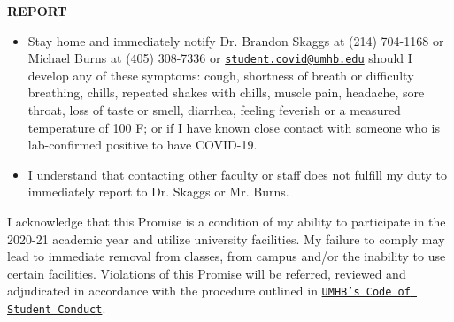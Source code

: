 \documentclass[
]{article}
\begin{document}
\textbf{REPORT}

\begin{itemize}
\item Stay home and immediately notify Dr. Brandon Skaggs at (214) 704-1168 or Michael Burns at (405) 308-7336 or \texttt{\href{mailto:student.covid@umhb.edu}{student.covid@umhb.edu}} should I develop any of these symptoms: cough, shortness of breath or difficulty breathing, chills, repeated shakes with chills, muscle pain, headache, sore throat, loss of taste or smell, diarrhea, feeling feverish or a measured temperature of 100 F; or if I have known close contact with someone who is lab-confirmed positive to have COVID-19. 
\item I understand that contacting other faculty or staff does not fulfill my duty to immediately report to Dr. Skaggs or Mr. Burns.
\end{itemize}

I acknowledge that this Promise is a condition of my ability to
participate in the 2020-21 academic year and utilize university
facilities. My failure to comply may lead to immediate removal from
classes, from campus and/or the inability to use certain facilities.
Violations of this Promise will be referred, reviewed and adjudicated in
accordance with the procedure outlined in
\texttt{\href{https://go.umhb.edu/students/student-handbook}{UMHB’s Code of Student Conduct}}.
\end{document}
